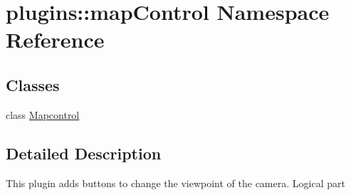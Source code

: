 \hypertarget{namespaceplugins_1_1map_control}{\section{plugins\-:\-:map\-Control \-Namespace \-Reference}
\label{namespaceplugins_1_1map_control}
}
\subsection*{\-Classes}
\begin{DoxyCompactItemize}
\item 
class \hyperlink{classplugins_1_1map_control_1_1_mapcontrol}{\-Mapcontrol}
\end{DoxyCompactItemize}


\subsection{\-Detailed \-Description}
\begin{DoxyVerb}
    This plugin adds buttons to change the viewpoint of the camera. Logical part
\end{DoxyVerb}
 